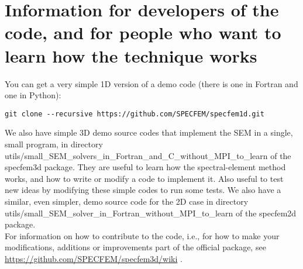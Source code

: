 
\chapter{Information for developers of the code, and for people who want to learn how the technique works}\label{cha:developers}

You can get a very simple 1D version of a demo code (there is one in Fortran and one in Python):
\begin{verbatim}
git clone --recursive https://github.com/SPECFEM/specfem1d.git
\end{verbatim}

\noindent We also have simple 3D demo source codes that implement the SEM in a single, small program, in directory\\
utils/small\_SEM\_solvers\_in\_Fortran\_and\_C\_without\_MPI\_to\_learn of the specfem3d package.
They are useful to learn how the spectral-element method works, and how to write or modify a code to implement it.
Also useful to test new ideas by modifying these simple codes to run some tests.
We also have a similar, even simpler, demo source code for the 2D case in directory\\
utils/small\_SEM\_solver\_in\_Fortran\_without\_MPI\_to\_learn of the specfem2d package.\\

\noindent For information on how to contribute to the code, i.e., for how to make your modifications, additions or improvements part of the
official package, see \url{https://github.com/SPECFEM/specfem3d/wiki} .


